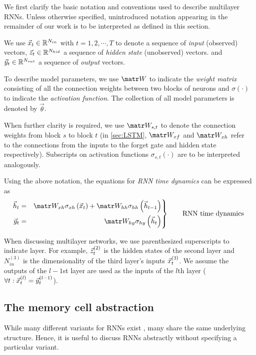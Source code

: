 We first clarify the basic notation and conventions used to describe multilayer
RNNs. Unless otherwise specified, unintroduced notation appearing in the
remainder of our work is to be interpreted as defined in this section.

We use $\vec{x}_t \in \mathbb{R}^{N_{in}}$ with $t=1,2,\cdots,T$ to denote a sequence of
\emph{input} (\ie observed) vectors, $\vec{z}_t \in \mathbb{R}^{N_{hid}}$ a sequence of
\emph{hidden state} (\ie unobserved) vectors. and $\vec{y}_t \in \mathbb{R}^{N_{out}}$ a
sequence of \emph{output} vectors.

To describe model parameters, we use $\W$ to indicate the \emph{weight matrix}
consisting of all the connection weights between two blocks of neurons
and $\sigma(\cdot)$ to indicate the \emph{activation function}. The collection
of all model parameters is denoted by $\vec{\theta}$.

When further clarity is required, we use $\W_{s,t}$ to denote the connection
weights from block $s$ to block $t$ (\ie in \cref{sec:LSTM}, $\W_{xf}$ and
$\W_{xh}$ refer to the connections from the inputs to the forget gate and
hidden state respectively). Subscripts on activation functions $\sigma_{s,t}(\cdot)$
are to be interpreted analogously.

Using the above notation, the equations for \emph{RNN time dynamics} can be expressed as
\begin{equation}\label{eq:rnn-dynamics}
 \left.\begin{aligned}
          \h_t &=& \W_{xh} \sigma_{xh} \left( \x_t \right) + \W_{hh} \sigma_{hh} \left( \h_{t-1} \right)\\
          \y_t &=& \W_{hy} \sigma_{hy} \left( \h_t \right)
       \end{aligned}
 \right\}
 \qquad \text{RNN time dynamics}
\end{equation}

When discussing multilayer networks, we use parenthesized superscripts to
indicate layer. For example, $\vec{z}^{(2)}_t$ is the hidden states of the second
layer and $N^{(3)}_{in}$ is the dimensionality of the third layer's inputs
$\vec{x}^{(3)}_t$. We assume the outputs of the $l-1$st layer are used as the inputs
of the $l$th layer (\ie $\forall t: \vec{x}^{(l)}_t = \vec{y}^{(l-1)}_t$).

\subsection{The memory cell abstraction}

While many different variants for RNNs exist
\citep{elman1990finding,jordan1997serial,hochreiter1997long,cho2014learning,Koutnik2014,Mikolov2015},
many share the same underlying structure. Hence, it is useful to discuss RNNs
abstractly without specifying a particular variant.

